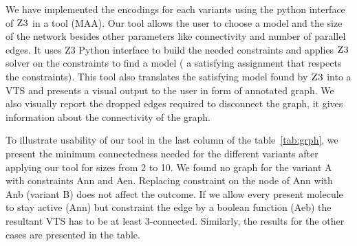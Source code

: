 %

We have implemented the encodings for each variants
using the python interface of $\textsc{Z3}$ in a tool (MAA).
%
Our tool allows the user to choose a model and the size of the network
besides other parameters like connectivity and number of parallel
edges.
%
It uses Z3 Python interface to build the needed constraints and
applies $\textsc{Z3}$ solver on the constraints to find a model (
a satisfying assignment that respects the constraints).
%
This tool also translates the satisfying model found by $\textsc{Z3}$ into
a VTS and presents a visual output to the user in form of annotated graph.
%
%
%
We also visually report the dropped edges required to disconnect the graph, it gives information about the connectivity of the graph.


To illustrate usability of our tool 
in the last column of the table~\ref{tab:grph}, we present the minimum connectedness needed for
the different variants after applying our tool for sizes from 2 to 10. 
%
We found no graph for the variant A with constraints Ann and Aen.
%
Replacing constraint on the node of Ann with Anb (variant B) does not affect the outcome.
%
If we allow every present molecule to stay active (Ann) but constraint the edge
by a boolean function (Aeb) the resultant VTS has to be at least 3-connected. Similarly, the results for the other cases are presented in the table. 
%
%

